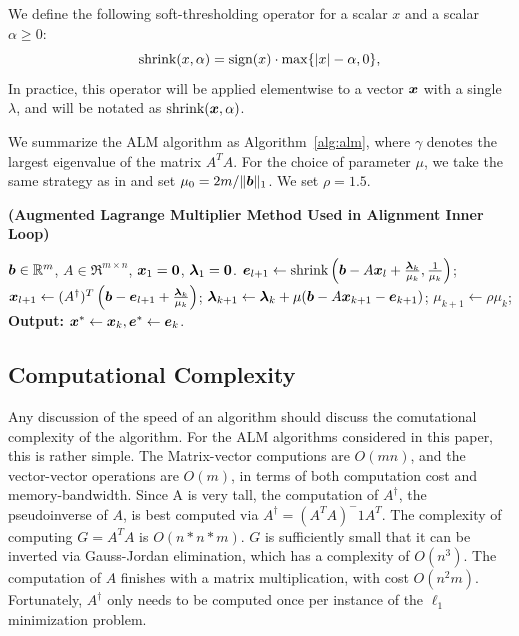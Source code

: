 \documentclass[10pt,twocolumn,letterpaper]{article}
\begin{document}

We define the following soft-thresholding operator for a
scalar $x$ and a scalar $\alpha \geq 0$:
\begin{equation}
\textup{shrink}(x,\alpha) = \textup{sign}(x)\cdot \max \{|x| - \alpha, 0\},
\end{equation}
In practice, this operator will be applied elementwise to a vector ${\boldsymbol{x}}$ with a single $\lambda$,
and will be notated as $\textup{shrink}({\boldsymbol{x}},\alpha)$.

We summarize the ALM algorithm as Algorithm~\ref{alg:alm}, where $\gamma$ denotes the
largest eigenvalue of the matrix $A^TA$. For the choice of parameter $\mu$, we take the same strategy as
in \cite{YangJ2009-pp} and set $\mu_0 = 2m / \|\boldsymbol{b}\|_1$. We set $\rho=1.5$.
\begin{algorithm}[h]
\caption{\bf (Augmented Lagrange Multiplier Method Used in Alignment Inner Loop)}
\begin{algorithmic}[1]
 $\boldsymbol{b} \in \mathbb R^m$, $A \in \Re^{m \times n}$,
${\boldsymbol{x}}_1 = \boldsymbol{0}$, $\boldsymbol{\lambda}_1 = \boldsymbol{0}$.
\STATE $\boldsymbol{e}_{l+1} \leftarrow \textup{shrink}\left(\boldsymbol{b} - A{\boldsymbol{x}}_l + \frac{\boldsymbol{\lambda}_k}{\mu_k}, \frac{1}{\mu_k}\right)$;
\STATE ${\boldsymbol{x}}_{l+1} \leftarrow (A^\dagger)^T \left(\boldsymbol{b} - \boldsymbol{e}_{l+1} + \frac{\boldsymbol{\lambda}_k}{\mu_k} \right) $;
\ENDWHILE
\STATE $\boldsymbol{\lambda}_{k+1} \leftarrow \boldsymbol{\lambda}_k + \mu (\boldsymbol{b} - A{\boldsymbol{x}}_{k+1} - \boldsymbol{e}_{k+1})$;
\STATE $\mu_{k+1} \leftarrow \rho\mu_k$;
\ENDWHILE \STATE
{\bf Output:} ${\boldsymbol{x}}^* \leftarrow {\boldsymbol{x}}_k, \boldsymbol{e}^* \leftarrow \boldsymbol{e}_k$.
\end{algorithmic}
\label{alg:alm}
\end{algorithm}


\subsection{Computational Complexity}
Any discussion of the speed of an algorithm should discuss the comutational complexity of the algorithm.  For the ALM
algorithms considered in this paper, this is rather simple.
The Matrix-vector computions are $O(mn)$, and the vector-vector operations are $O(m)$, 
in terms of both computation cost and memory-bandwidth.  Since A is very tall, 
the computation of $A^\dagger$, the pseudoinverse of $A$, is best computed via $A^\dagger = (A^TA)^-1 A^T$.
The complexity of computing $G = A^T A$ is $O(n*n*m)$.  $G$ is sufficiently small that it can be inverted via
Gauss-Jordan elimination, which has a complexity of $O(n^3)$.  The computation of $A$ finishes with a matrix
multiplication, with cost $O(n^2 m)$.
Fortunately, $A^\dagger$ only needs to be computed once per instance of the $\ell_1$ minimization problem.
\end{document}
